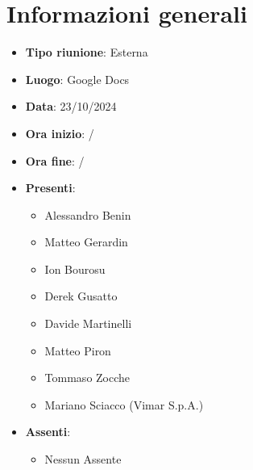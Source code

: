 \section{Informazioni generali}
\begin{itemize}
    \item \textbf{Tipo riunione}: Esterna
    \item \textbf{Luogo}: Google Docs  \item \textbf{Data}: 23/10/2024
    \item \textbf{Ora inizio}: /
    \item \textbf{Ora fine}: /  
    \item \textbf{Presenti}:
    \begin{itemize}
        \item Alessandro Benin
        \item Matteo Gerardin
        \item Ion Bourosu
        \item Derek Gusatto
        \item Davide Martinelli
        \item Matteo Piron
        \item Tommaso Zocche
        \item Mariano Sciacco (Vimar S.p.A.)
  \end{itemize}

  \item \textbf{Assenti}:
  \begin{itemize}
        \item Nessun Assente
  \end{itemize}
 
\end{itemize}